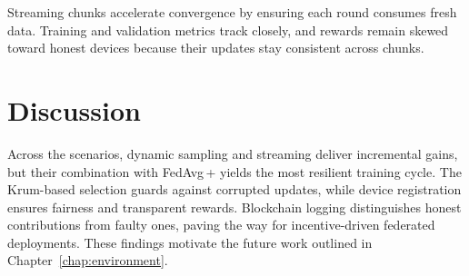 Streaming chunks accelerate convergence by ensuring each round consumes fresh data. Training and validation metrics track closely, and rewards remain skewed toward honest devices because their updates stay consistent across chunks.

\section{Discussion}

Across the scenarios, dynamic sampling and streaming deliver incremental gains, but their combination with FedAvg\,+ yields the most resilient training cycle. The Krum-based selection guards against corrupted updates, while device registration ensures fairness and transparent rewards. Blockchain logging distinguishes honest contributions from faulty ones, paving the way for incentive-driven federated deployments. These findings motivate the future work outlined in Chapter~\ref{chap:environment}.

